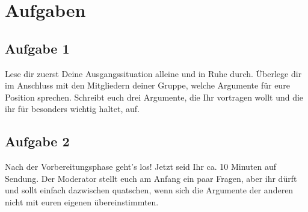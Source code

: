 \documentclass[11pt,a4paper,DIV=10,parskip=half,BCOR=0mm]{scrartcl}
\begin{document}
\section*{Aufgaben}
\subsection*{Aufgabe 1}
Lese  dir zuerst Deine Ausgangssituation alleine und in Ruhe durch. Überlege dir im Anschluss mit den Mitgliedern deiner Gruppe, welche Argumente für eure Position sprechen. Schreibt euch drei Argumente, die
Ihr vortragen wollt und die ihr für besonders wichtig haltet, auf. 
\subsection*{Aufgabe 2}
Nach der Vorbereitungsphase geht’s los! Jetzt seid Ihr ca. 10 Minuten auf Sendung. Der Moderator stellt euch am Anfang ein paar Fragen, aber ihr dürft und sollt einfach dazwischen quatschen, wenn sich die Argumente
der anderen nicht mit euren eigenen übereinstimmten.
\end{document}
